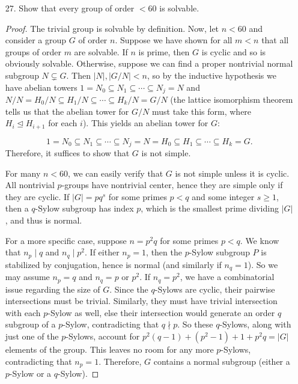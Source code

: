 \documentclass[10pt]{article}
\begin{document}
\begin{enumerate}
\begin{enumerate}
\begin{proof}
By the lemma, $PQ \cong P \times Q$.  Also, $G = PQ$ because $|PQ| = \frac{|P||Q|}{|P\cap Q|} = pq$.  Since $P$ and $Q$ are cyclic with relatively prime orders, $P \times Q$ is cyclic, therefore $G$ is cyclic.
\end{proof}
\item Show that every group of order 15 is cyclic.
\begin{proof}
$15 = 3 \cdot 5$, and $5 \equiv 2 \not \equiv 1 \pmod{3}$, hence all groups of order 15 are cyclic by the result of part (a).
\end{proof}
\end{enumerate}

\pagebreak
\item[27.] Show that every group of order $< 60$ is solvable.
\begin{proof}
The trivial group is solvable by definition.  Now, let $n < 60$ and consider a group $G$ of order $n$.  Suppose we have shown for all $m < n$ that all groups of order $m$ are solvable.  If $n$ is prime, then $G$ is cyclic and so is obviously solvable.  Otherwise, suppose we can find a proper nontrivial normal subgroup $N \subsetneq G$.  Then $|N|, |G/N| < n$, so by the inductive hypothesis we have abelian towers $1 = N_0 \subseteq N_1 \subseteq \cdots \subseteq N_j = N$ and $N/N = H_0 / N \subseteq H_1 / N \subseteq \cdots \subseteq H_k / N = G / N$ (the lattice isomorphism theorem tells us that the abelian tower for $G/N$ must take this form, where $H_i \trianglelefteq H_{i+1}$ for each $i$).  This yields an abelian tower for $G$:

$$
1 = N_0 \subseteq N_1 \subseteq \cdots \subseteq N_j = N = H_0 \subseteq H_1 \subseteq \cdots \subseteq H_k = G.
$$
Therefore, it suffices to show that $G$ is not simple.

For many $n < 60$, we can easily verify that $G$ is not simple unless it is cyclic.  All nontrivial $p$-groups have nontrivial center, hence they are simple only if they are cyclic.  If $|G| = pq^s$ for some primes $p < q$ and some integer $s \geq 1$, then a $q$-Sylow subgroup has index $p$, which is the smallest prime dividing $|G|$, and thus is normal.

For a more specific case, suppose $n = p^2q$ for some primes $p < q$.  We know that $n_p \mid q$ and $n_q \mid p^2$.  If either $n_p = 1$, then the $p$-Sylow subgroup $P$ is stabilized by conjugation, hence is normal (and similarly if $n_q = 1$).  So we may assume $n_p = q$ and $n_q = p$ or $p^2$.  If $n_q = p^2$, we have a combinatorial issue regarding the size of $G$.  Since the $q$-Sylows are cyclic, their pairwise intersections must be trivial.  Similarly, they must have trivial intersection with each $p$-Sylow as well, else their intersection would generate an order $q$ subgroup of a $p$-Sylow, contradicting that $q \nmid p$.  So these $q$-Sylows, along with just one of the $p$-Sylows, account for $p^2(q-1) + (p^2 - 1) + 1 + p^2q = |G|$ elements of the group.  This leaves no room for any more $p$-Sylows, contradicting that $n_p = 1$.  Therefore, $G$ contains a normal subgroup (either a $p$-Sylow or a $q$-Sylow).


\end{proof}
\end{enumerate}
\end{document}
